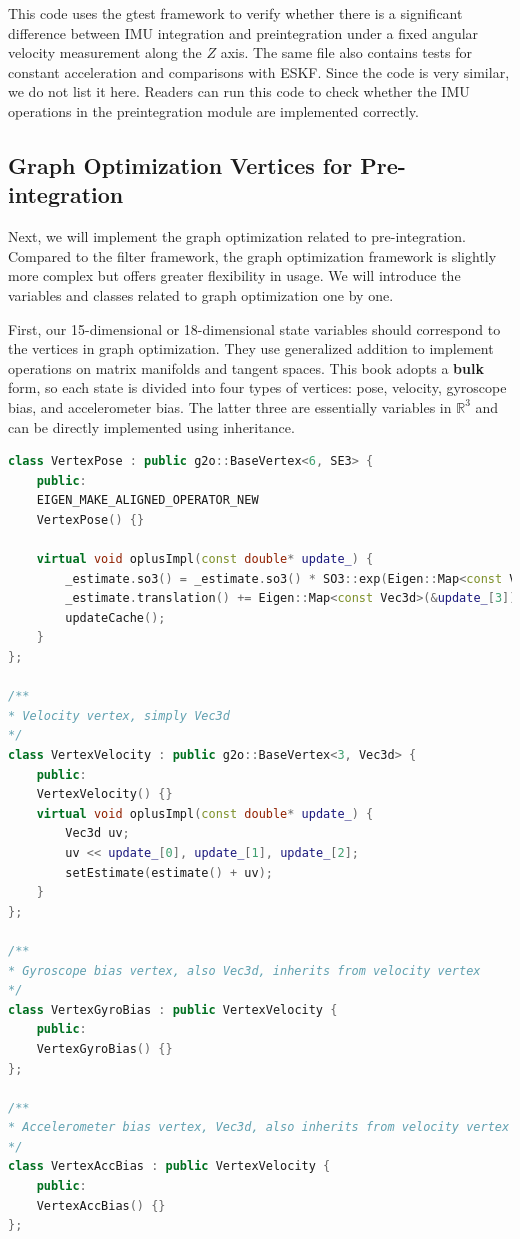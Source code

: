 This code uses the gtest framework to verify whether there is a significant difference between IMU integration and preintegration under a fixed angular velocity measurement along the $Z$ axis. The same file also contains tests for constant acceleration and comparisons with ESKF. Since the code is very similar, we do not list it here. Readers can run this code to check whether the IMU operations in the preintegration module are implemented correctly.

\subsection{Graph Optimization Vertices for Pre-integration}

Next, we will implement the graph optimization related to pre-integration. Compared to the filter framework, the graph optimization framework is slightly more complex but offers greater flexibility in usage. We will introduce the variables and classes related to graph optimization one by one.

First, our 15-dimensional or 18-dimensional state variables should correspond to the vertices in graph optimization. They use generalized addition to implement operations on matrix manifolds and tangent spaces. This book adopts a \textbf{bulk} form, so each state is divided into four types of vertices: pose, velocity, gyroscope bias, and accelerometer bias. The latter three are essentially variables in $\mathbb{R}^3$ and can be directly implemented using inheritance.

\begin{lstlisting}[language=c++,caption=src/common/g2o\_types.h]
class VertexPose : public g2o::BaseVertex<6, SE3> {
	public:
	EIGEN_MAKE_ALIGNED_OPERATOR_NEW
	VertexPose() {}
	
	virtual void oplusImpl(const double* update_) {
		_estimate.so3() = _estimate.so3() * SO3::exp(Eigen::Map<const Vec3d>(&update_[0]));  // Rotation part
		_estimate.translation() += Eigen::Map<const Vec3d>(&update_[3]);                     // Translation part
		updateCache();
	}
};

/**
* Velocity vertex, simply Vec3d
*/
class VertexVelocity : public g2o::BaseVertex<3, Vec3d> {
	public:
	VertexVelocity() {}
	virtual void oplusImpl(const double* update_) {
		Vec3d uv;
		uv << update_[0], update_[1], update_[2];
		setEstimate(estimate() + uv);
	}
};

/**
* Gyroscope bias vertex, also Vec3d, inherits from velocity vertex
*/
class VertexGyroBias : public VertexVelocity {
	public:
	VertexGyroBias() {}
};

/**
* Accelerometer bias vertex, Vec3d, also inherits from velocity vertex
*/
class VertexAccBias : public VertexVelocity {
	public:
	VertexAccBias() {}
};
\end{lstlisting}

